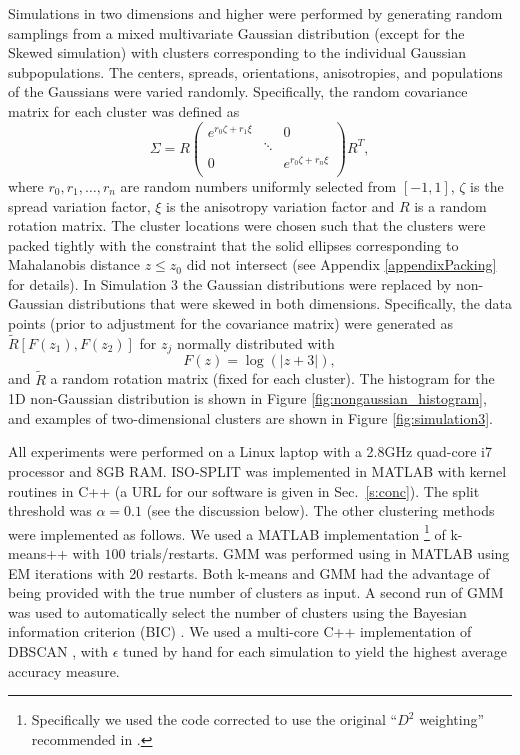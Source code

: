 \documentclass[10pt]{article}
\begin{document}
Simulations in two dimensions and higher were performed by generating random samplings from a mixed multivariate Gaussian distribution (except for the Skewed simulation) with clusters corresponding to the individual Gaussian subpopulations. The centers, spreads, orientations, anisotropies, and populations of the Gaussians were varied randomly. Specifically, the random covariance matrix for each cluster was defined as
\[
\Sigma=R
\left(
\begin{array}{ccc}
e^{r_0\zeta + r_1\xi} & & 0 \\
 & \ddots &  \\
 0 &  & e^{r_0\zeta + r_n\xi} \\
\end{array}
\right)R^T,
\]
where $r_0,r_1,\dots,r_n$ are random numbers uniformly selected from $[-1,1]$, $\zeta$ is the spread variation factor, $\xi$ is the anisotropy variation factor and $R$ is a random rotation matrix. The cluster locations were chosen such that the clusters were packed tightly with the constraint that the solid ellipses corresponding to Mahalanobis distance $z\leq z_0$ did not intersect (see Appendix \ref{appendixPacking} for details). In Simulation 3 the Gaussian distributions were replaced by non-Gaussian distributions that were skewed in both dimensions. Specifically, the data points (prior to adjustment for the covariance matrix) were generated as $\tilde{R}[F(z_1),F(z_2)]$ for $z_j$ normally distributed with
\begin{equation}
\label{eq:nongaussian}F(z)=\log(|z+3|),
\end{equation}
and $\tilde{R}$ a random rotation matrix (fixed for each cluster). The histogram for the 1D non-Gaussian distribution is shown in Figure \ref{fig:nongaussian_histogram}, and examples of two-dimensional clusters are shown in Figure \ref{fig:simulation3}.

All experiments were performed on a Linux laptop with a 2.8GHz quad-core
i7 processor and 8GB RAM.
ISO-SPLIT was implemented in MATLAB with kernel routines in C++
(a URL for our software is given in Sec.~\ref{s:conc}).
The split threshold was $\alpha=0.1$ (see the discussion below).
The other clustering methods were implemented as follows.
We used a MATLAB implementation%
\footnote{Specifically we used the code \cite{kmeanspp_sorber} corrected to use
  the original ``$D^2$ weighting'' recommended in \cite{kmeanspp}.}
 of k-means++
 with $100$ trials/restarts. GMM was performed using \cite{vlfeat} in MATLAB using EM iterations with 20 restarts. Both k-means and GMM had the advantage of being provided with the true number of clusters as input. A second run of GMM was used to automatically select the number of clusters using the Bayesian information criterion (BIC) \cite{BIC}. We used a multi-core C++ implementation of DBSCAN \cite{dbscan_dbp}, with $\epsilon$ tuned by hand for each simulation to yield the highest average accuracy measure.
\end{document}
